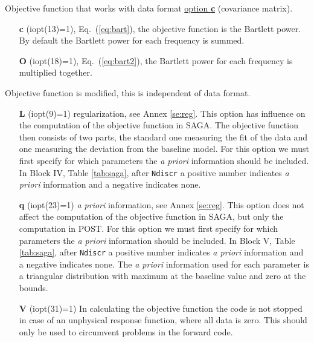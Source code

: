 \documentclass{saclantc}
\begin{document}
Objective function that works with data format \underline{option {\bf c}}
(covariance matrix).
\vspace{-0.6cm}
\begin{itemize}
 \item[{\bf c}] (iopt(13)=1), Eq.\ (\ref{eq:bart}), 
        the objective function is the Bartlett power.
         By default the Bartlett power for each frequency is summed.
\vspace{-0.3cm}
    \item[{\bf O}] (iopt(18)=1),  Eq.\ (\ref{eq:bart2}),  
           the Bartlett power for each frequency is multiplied together.
\end{itemize}

Objective function is modified, this is independent of  data format.
\vspace{-0.6cm}
\begin{itemize}
    \item[{\bf L}] (iopt(9)=1)    regularization, see Annex
\ref{se:reg}. This
option  has influence on the computation of  the objective function in
{\sf SAGA}. The objective function then consists of two parts, the
standard one measuring the fit of the data and one
measuring the deviation from the baseline model. For this option
we must first specify for which parameters the {\it a
priori} information should be included. In Block IV, Table
\ref{tab:saga}, after {\tt Ndiscr}  a positive number indicates 
{\it a priori} information and a negative indicates none.
\vspace{-0.3cm}
    \item[{\bf q}] (iopt(23)=1)    {\it a priori} information, 
see Annex \ref{se:reg}. This
option does not affect the computation of the objective function in
{\sf SAGA}, but only the computation in {\sf POST}. For this option
we must first specify for which parameters  the {\it a
priori} information should be included. In Block V, Table
\ref{tab:saga}, after {\tt Ndiscr}  a positive number indicates 
{\it a priori} information and a negative indicates none.
The {\it a priori } information used for each parameter
 is a triangular distribution
with maximum at the baseline value and zero at the bounds.
    \item[{\bf V}] (iopt(31)=1)    In calculating the objective function the code is not stopped in case of an unphysical response function, where all data is zero. This should only be used to circumvent problems in the forward code.
\end{itemize}
\end{document}

